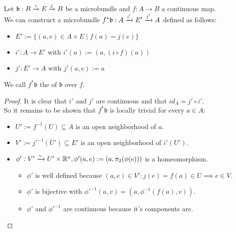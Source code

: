 \\ Let $\mathfrak{b}: \bundle{B}{E}{i}{j}$ be a microbundle and $f: A \to B$ a continuous map.
\\ We can construct a microbundle $f^*\mathfrak{b}: \bundle{A}{E'}{i'}{j'}$ defined as follows:
\begin{itemize}
    \item $E' := \{ (a, e) \in A \times E \mid f(a) = j(e) \}$
    \item $i': A \to E'$ with $i'(a) := (a, (i \circ f)(a))$
    \item $j': E' \to A$ with $j'(a, e) := a$
\end{itemize}
We call $f^*\mathfrak{b}$ the  of $\mathfrak{b}$ over $f$.
\begin{proof}
It is clear that $i'$ and $j'$ are continuous and that $id_A = j' \circ i'$.
\\ So it remains to be shown that $f^*\mathfrak{b}$ is locally trivial for every $a \in A$:
\begin{itemize}
    \item $U' := f^{-1}(U) \subseteq A$ is an open neighborhood of $a$.
    \item $V' := j'^{-1}(U') \subseteq E'$ is an open neighborhood of $i'(U')$.
    \item $\phi': V' \isomto U' \times \R^n, \phi'(a, e) := (a, \pi_2(\phi(e)))$ is a homeomorphism.
    \begin{itemize}
        \item $\phi'$ is well defined because $(a, e) \in V': j(e) = f(a) \in U \implies e \in V$.
        \item $\phi'$ is bijective with $\phi'^{-1}(a, v) = (a, \phi^{-1}(f(a), v))$.
        \item $\phi'$ and $\phi'^{-1}$ are continuous because it's components are.
    \end{itemize}
\end{itemize}
\end{proof}